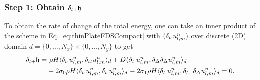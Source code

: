 {\subsubsection{Step 1: Obtain $\delta_{t+} \mathfrak{h}$}
To obtain the rate of change of the total energy, one can take an inner product of the scheme in Eq. \eqref{eq:thinPlateFDSCompact} with $(\delta_{t\cdot} u_{l,m}^n)$ over discrete (2D) domain $d = \{0, \hdots, N_x\}\times \{0, \hdots, N_y\}$ to get
\begin{equation}\label{eq:rOCthinPlate}
    \begin{aligned}
        \delta_{t+} \mathfrak{h} =&\ \rho H \langle \delta_{t\cdot} u_{l,m}^n, \delta_{tt} u_{l,m}^n \rangle_d + D \langle \delta_{t\cdot} u_{l,m}^n, \delta_{\Delta}\delta_{\Delta} u_{l,m}^n \rangle_d\\
        & + 2\sigma_{0}\rho H\langle \delta_{t\cdot} u_{l,m}^n, \delta_{t\cdot} u_{l,m}^n \rangle_d - 2\sigma_{1} \rho H\langle \delta_{t\cdot} u_{l,m}^n, \delta_{t-} \delta_{\Delta} u_{l,m}^n \rangle_d = 0.
    \end{aligned}
\end{equation}

}
